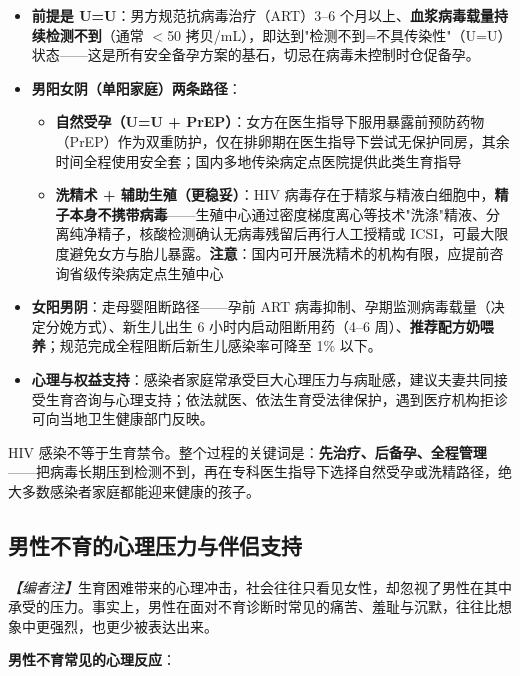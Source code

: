 \begin{itemize}
	\item \textbf{前提是 U=U}：男方规范抗病毒治疗（ART）3--6 个月以上、\textbf{血浆病毒载量持续检测不到}（通常 $<$50 拷贝/mL），即达到"检测不到=不具传染性"（U=U）状态——这是所有安全备孕方案的基石，切忌在病毒未控制时仓促备孕。
	\item \textbf{男阳女阴（单阳家庭）两条路径}：
	\begin{itemize}
		\item \textbf{自然受孕（U=U + PrEP）}：女方在医生指导下服用暴露前预防药物（PrEP）作为双重防护，仅在排卵期在医生指导下尝试无保护同房，其余时间全程使用安全套；国内多地传染病定点医院提供此类生育指导
		\item \textbf{洗精术 + 辅助生殖（更稳妥）}：HIV 病毒存在于精浆与精液白细胞中，\textbf{精子本身不携带病毒}——生殖中心通过密度梯度离心等技术"洗涤"精液、分离纯净精子，核酸检测确认无病毒残留后再行人工授精或 ICSI，可最大限度避免女方与胎儿暴露。\textbf{注意}：国内可开展洗精术的机构有限，应提前咨询省级传染病定点生殖中心
	\end{itemize}
	\item \textbf{女阳男阴}：走母婴阻断路径——孕前 ART 病毒抑制、孕期监测病毒载量（决定分娩方式）、新生儿出生 6 小时内启动阻断用药（4--6 周）、\textbf{推荐配方奶喂养}；规范完成全程阻断后新生儿感染率可降至 1\% 以下。
	\item \textbf{心理与权益支持}：感染者家庭常承受巨大心理压力与病耻感，建议夫妻共同接受生育咨询与心理支持；依法就医、依法生育受法律保护，遇到医疗机构拒诊可向当地卫生健康部门反映。
\end{itemize}

\begin{tcolorbox}[colback=pink!5!white,colframe=red!50!black,title=贴心小叮咛]
HIV 感染不等于生育禁令。整个过程的关键词是：\textbf{先治疗、后备孕、全程管理}——把病毒长期压到检测不到，再在专科医生指导下选择自然受孕或洗精路径，绝大多数感染者家庭都能迎来健康的孩子。
\end{tcolorbox}

\subsection{男性不育的心理压力与伴侣支持}
\label{subsec:male_infertility_psych}

\noindent\textit{【编者注】}生育困难带来的心理冲击，社会往往只看见女性，却忽视了男性在其中承受的压力。事实上，男性在面对不育诊断时常见的痛苦、羞耻与沉默，往往比想象中更强烈，也更少被表达出来。

\vspace{0.5em}
\noindent\textbf{男性不育常见的心理反应}：

